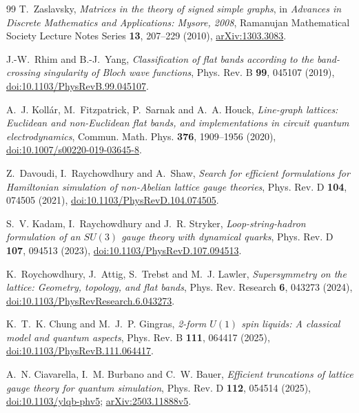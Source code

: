 \documentclass[11pt]{article}
\theoremstyle{plain}
\theoremstyle{definition}
\theoremstyle{remark}
\begin{document}
\begin{thebibliography}{99}
 T.~Zaslavsky,
  \emph{Matrices in the theory of signed simple graphs}, in
  \emph{Advances in Discrete Mathematics and Applications: Mysore, 2008},
  Ramanujan Mathematical Society Lecture Notes Series \textbf{13}, 207--229
  (2010), \href{https://arxiv.org/abs/1303.3083}{arXiv:1303.3083}.

 J.-W.~Rhim and B.-J.~Yang,
  \emph{Classification of flat bands according to the band-crossing
  singularity of Bloch wave functions}, Phys. Rev. B \textbf{99}, 045107
  (2019), \href{https://doi.org/10.1103/PhysRevB.99.045107}{doi:10.1103/PhysRevB.99.045107}.

 A.~J. Koll\'ar, M.~Fitzpatrick, P.~Sarnak and A.~A. Houck,
  \emph{Line-graph lattices: Euclidean and non-Euclidean flat bands, and
  implementations in circuit quantum electrodynamics}, Commun. Math. Phys.
  \textbf{376}, 1909--1956 (2020),
  \href{https://doi.org/10.1007/s00220-019-03645-8}{doi:10.1007/s00220-019-03645-8}.

 Z.~Davoudi, I.~Raychowdhury and A.~Shaw,
  \emph{Search for efficient formulations for Hamiltonian simulation of
  non-Abelian lattice gauge theories}, Phys. Rev. D \textbf{104}, 074505
  (2021), \href{https://doi.org/10.1103/PhysRevD.104.074505}{doi:10.1103/PhysRevD.104.074505}.

 S.~V. Kadam, I.~Raychowdhury and J.~R. Stryker,
  \emph{Loop-string-hadron formulation of an $SU(3)$ gauge theory with
  dynamical quarks}, Phys. Rev. D \textbf{107}, 094513 (2023),
  \href{https://doi.org/10.1103/PhysRevD.107.094513}{doi:10.1103/PhysRevD.107.094513}.

 K.~Roychowdhury, J.~Attig, S.~Trebst and
  M.~J. Lawler, \emph{Supersymmetry on the lattice: Geometry, topology, and
  flat bands}, Phys. Rev. Research \textbf{6}, 043273 (2024),
  \href{https://doi.org/10.1103/PhysRevResearch.6.043273}{doi:10.1103/PhysRevResearch.6.043273}.

 K.~T.~K. Chung and M.~J.~P. Gingras,
  \emph{2-form $U(1)$ spin liquids: A classical model and quantum aspects},
  Phys. Rev. B \textbf{111}, 064417 (2025),
  \href{https://doi.org/10.1103/PhysRevB.111.064417}{doi:10.1103/PhysRevB.111.064417}.

 A.~N. Ciavarella, I.~M. Burbano and C.~W. Bauer,
  \emph{Efficient truncations of lattice gauge theory for quantum simulation},
  Phys. Rev. D \textbf{112}, 054514 (2025),
  \href{https://doi.org/10.1103/ylqb-phv5}{doi:10.1103/ylqb-phv5};
  \href{https://arxiv.org/abs/2503.11888}{arXiv:2503.11888v5}.


\end{thebibliography}
\end{document}
